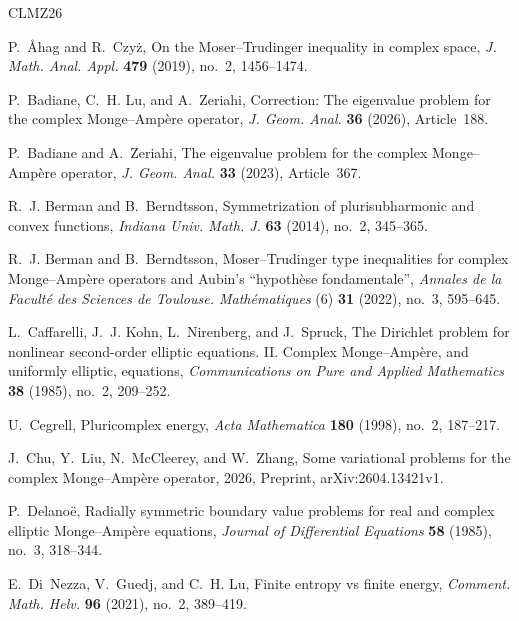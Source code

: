 \documentclass[11pt]{article}
\begin{document}
\begin{thebibliography}{CLMZ26}

P.~{\AA}hag and R.~Czy{\.{z}}, On the {Moser--Trudinger} inequality in complex
  space, \emph{J. Math. Anal. Appl.} \textbf{479} (2019), no.~2,
  \mbox{1456--1474}.

P.~Badiane, C.~H. Lu, and A.~Zeriahi, Correction: The eigenvalue problem for
  the complex {Monge--Amp\`ere} operator, \emph{J. Geom. Anal.} \textbf{36}
  (2026), Article~188.

P.~Badiane and A.~Zeriahi, The eigenvalue problem for the complex
  {Monge--Amp\`ere} operator, \emph{J. Geom. Anal.} \textbf{33} (2023),
  Article~367.

R.~J. Berman and B.~Berndtsson, Symmetrization of plurisubharmonic and convex
  functions, \emph{Indiana Univ. Math. J.} \textbf{63} (2014), no.~2,
  \mbox{345--365}.

R.~J. Berman and B.~Berndtsson, {Moser--Trudinger} type inequalities for
  complex {Monge--Amp\`ere} operators and {Aubin}'s ``hypoth\`ese
  fondamentale'', \emph{Annales de la Facult{\'e} des Sciences de Toulouse.
  Math{\'e}matiques} (6) \textbf{31} (2022), no.~3, \mbox{595--645}.

L.~Caffarelli, J.~J. Kohn, L.~Nirenberg, and J.~Spruck, The {Dirichlet} problem
  for nonlinear second-order elliptic equations. {II}. {Complex}
  {Monge--Amp\`ere}, and uniformly elliptic, equations, \emph{Communications on
  Pure and Applied Mathematics} \textbf{38} (1985), no.~2, \mbox{209--252}.

U.~Cegrell, Pluricomplex energy, \emph{Acta Mathematica} \textbf{180}
  (1998), no.~2, \mbox{187--217}.

J.~Chu, Y.~Liu, N.~McCleerey, and W.~Zhang, Some variational problems for the
  complex {Monge--Amp\`ere} operator, 2026, Preprint, arXiv:2604.13421v1.

P.~Delano{\"e}, Radially symmetric boundary value problems for real and complex
  elliptic {Monge--Amp\`ere} equations, \emph{Journal of Differential
  Equations} \textbf{58} (1985), no.~3, \mbox{318--344}.

E.~Di~Nezza, V.~Guedj, and C.~H. Lu, Finite entropy vs finite energy,
  \emph{Comment. Math. Helv.} \textbf{96} (2021), no.~2, \mbox{389--419}.


\end{thebibliography}
\end{document}
